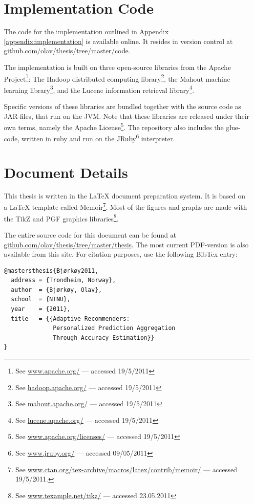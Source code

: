 \section{Implementation Code}

The code for the implementation outlined in Appendix \ref{appendix:implementation} is available online.
It resides in version control at 
\url{github.com/olav/thesis/tree/master/code}.

The implementation is built on three open-source libraries from the
Apache Project\footnote{See \url{www.apache.org/} --- accessed 19/5/2011}:
The Hadoop distributed computing library\footnote{See \url{hadoop.apache.org/} --- accessed 19/5/2011},
the Mahout machine learning library\footnote{See \url{mahout.apache.org/} --- accessed 19/5/2011},
and the Lucene information retrieval library\footnote{See \url{lucene.apache.org/} --- accessed 19/5/2011}.

Specific versions of these libraries are bundled together with
the source code as JAR-files, that run on the JVM.
Note that these libraries are released under their own terms,
namely the Apache License\footnote{
See \url{www.apache.org/licenses/} --- accessed 19/5/2011}.
The repository also includes the glue-code, written in ruby and run on the JRuby\footnote{
See \url{www.jruby.org/} --- accessed 09/05/2011} interpreter.

\section{Document Details}

This thesis is written in the LaTeX document preparation system.
It is based on a LaTeX-template called Memoir\footnote{
See \url{www.ctan.org/tex-archive/macros/latex/contrib/memoir/} --- accessed 19/5/2011.}.
Most of the figures and graphs are made with the TikZ and PGF graphics libraries\footnote{
See \url{www.texample.net/tikz/} --- accessed 23.05.2011}.

The entire source code for this document can be found at 
\url{github.com/olav/thesis/tree/master/thesis}.
The most current PDF-version is also available from this site.
For citation purposes, use the following BibTex entry:

{
\footnotesize
\begin{verbatim}
@mastersthesis{Bjørkøy2011,
  address = {Trondheim, Norway},
  author  = {Bjørkøy, Olav},
  school  = {NTNU},
  year    = {2011},
  title   = {{Adaptive Recommenders: 
              Personalized Prediction Aggregation
              Through Accuracy Estimation}}
} 
\end{verbatim}
}

